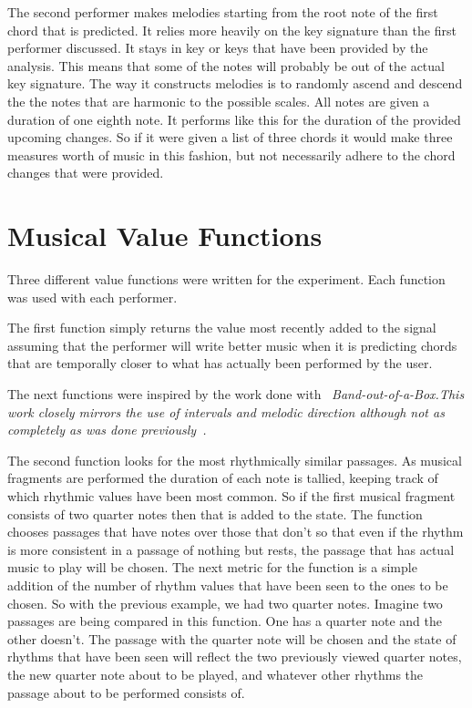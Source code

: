 \documentclass[12pt]{ucthesis}
\begin{document}
{The second performer makes melodies starting from the root note of the first chord that is predicted. It relies more heavily on the key signature than the first performer discussed. It stays in key or keys that have been provided by the analysis. This means that some of the notes will probably be out of the actual key signature. The way it constructs melodies is to randomly ascend and descend the the notes that are harmonic to the possible scales. All notes are given a duration of one eighth note. It performs like this for the duration of the provided upcoming changes. So if it were given a list of three chords it would make three measures worth of music in this fashion, but not necessarily adhere to the chord changes that were provided.

\section{Musical Value Functions}
\label {musical-value-functions}
Three different value functions were written for the experiment. Each function was used with each performer. 

The first function simply returns the value most recently added to the signal assuming that the performer will write better music when it is predicting chords that are temporally closer to what has actually been performed by the user.  

The next functions were inspired by the work done with ~\em{Band-out-of-a-Box.}\em This work closely mirrors the use of intervals and melodic direction although not as completely as was done previously~\cite{bob}.

The second function looks for the most rhythmically similar passages. As musical fragments are performed the duration of each note is tallied, keeping track of which rhythmic values have been most common. So if the first musical fragment consists of two quarter notes then that is added to the state. The function chooses passages that have notes over those that don't so that even if the rhythm is more consistent in a passage of nothing but rests, the passage that has actual music to play will be chosen. The next metric for the function is a simple addition of the number of rhythm values that have been seen to the ones to be chosen. So with the previous example, we had two quarter notes. Imagine two passages are being compared in this function. One has a quarter note and the other doesn't. The passage with the quarter note will be chosen and the state of rhythms that have been seen will reflect the two previously viewed quarter notes, the new quarter note about to be played, and whatever other rhythms the passage about to be performed consists of.

}
\end{document}
